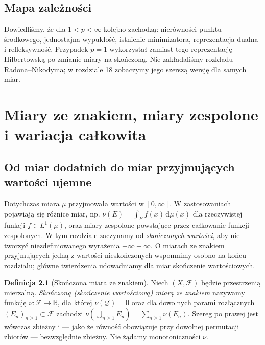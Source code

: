 \documentclass[11pt,a4paper,oneside]{book}
\numberwithin{equation}{chapter}
\theoremstyle{plain}
\theoremstyle{definition}
\newtheorem{definicja}[twierdzenie]{Definicja}
\theoremstyle{remark}
\begin{document}
\section{Mapa zależności}
Dowiedliśmy, że dla $1<p<\infty$ kolejno zachodzą:
nierówności punktu środkowego, jednostajna wypukłość,
istnienie minimizatora, reprezentacja dualna i
refleksywność. Przypadek $p=1$ wykorzystał zamiast tego
reprezentację Hilbertowską po zmianie miary na skończoną.
Nie zakładaliśmy rozkładu Radona--Nikodyma; w rozdziale 18
zobaczymy jego szerszą wersję dla samych miar.



\chapter[Miary ze znakiem i zespolone]{Miary ze znakiem, miary zespolone i wariacja całkowita}
\label{ch:miary-ze-znakiem}

\section{Od miar dodatnich do miar przyjmujących wartości ujemne}
Dotychczas miara $\mu$ przyjmowała wartości w $[0,\infty]$.
W zastosowaniach pojawiają się różnice miar, np.
$\nu(E)=\int_E f(x)\,\mathrm d\mu(x)$ dla rzeczywistej
funkcji $f\in L^1(\mu)$, oraz miary zespolone
powstające przez całkowanie funkcji zespolonych.
W tym rozdziale zaczynamy od \emph{skończonych wartości},
aby nie tworzyć niezdefiniowanego wyrażenia $+\infty-\infty$.
O miarach ze znakiem przyjmujących jedną z wartości
nieskończonych wspomnimy osobno na końcu rozdziału;
główne twierdzenia udowadniamy dla miar skończenie wartościowych.

\begin{definicja}[Skończona miara ze znakiem]
\label{def:signed-measure-16}
Niech $(X,\mathcal F)$ będzie przestrzenią mierzalną.
\emph{Skończoną (skończenie wartościową) miarą ze znakiem}
nazywamy funkcję $\nu:\mathcal F\to\mathbb R$, dla której
$\nu(\varnothing)=0$ oraz dla dowolnych parami rozłącznych
$(E_n)_{n\ge1}\subset\mathcal F$ zachodzi
$\nu(\bigcup_{n\ge1}E_n)=\sum_{n\ge1}\nu(E_n)$.
Szereg po prawej jest wówczas zbieżny i — jako że równość
obowiązuje przy dowolnej permutacji zbiorów — bezwzględnie
zbieżny. Nie żądamy monotoniczności $\nu$.
\end{definicja}
\end{document}
